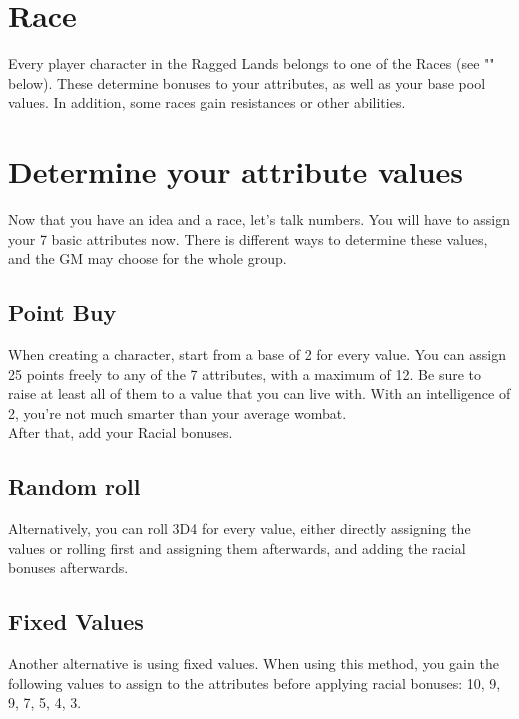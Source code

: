 \section{Race}\label{sec:charCreationRace}

Every player character in the Ragged Lands belongs to one of the Races (see "" below).
These determine bonuses to your attributes, as well as your base pool values. 
In addition, some races gain resistances or other abilities.


\section{Determine your attribute values}\label{sec:determineAttributes}

Now that you have an idea and a race, let's talk numbers.
You will have to assign your 7 basic attributes now.
There is different ways to determine these values, and the GM may choose for the whole group.


\subsection{Point Buy}\label{subsec:pointBuy}

When creating a character, start from a base of 2 for every value.
You can assign 25 points freely to any of the 7 attributes, with a maximum of 12.
Be sure to raise at least all of them to a value that you can live with.
With an intelligence of 2, you're not much smarter than your average wombat.\\
After that, add your Racial bonuses.



\subsection{Random roll}\label{subsec:pointRoll}

Alternatively, you can roll 3D4 for every value, either directly assigning the values or rolling first and assigning them afterwards, and adding the racial bonuses afterwards. 


\subsection{Fixed Values}\label{subsec:pointFixed}

Another alternative is using fixed values.
When using this method, you gain the following values to assign to the attributes before applying racial bonuses: 10, 9, 9, 7, 5, 4, 3.


